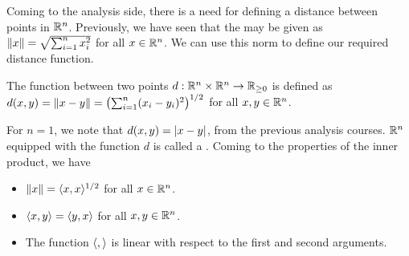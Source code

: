 Coming to the analysis side, there is a need for defining a distance between points in $\mathbb{R}^{n}$. Previously, we have seen that the  may be given as $\left\lVert x\right\rVert = \sqrt{\sum_{i=1}^{n} x_{i}^{2}}$ for all $x \in \mathbb{R}^{n}$. We can use this norm to define our required distance function.

\begin{definition}
    The  function between two points $d:\mathbb{R}^{n} \times \mathbb{R}^{n} \to \mathbb{R}_{\geq 0}$ is defined as $d(x,y) = \left\lVert x-y\right\rVert = \left( \sum_{i=1}^{n} (x_{i}-y_{i})^{2} \right)^{1/2}$ for all $x,y \in \mathbb{R}^{n}$.
\end{definition}
For $n = 1$, we note that $d(x,y) = \left| x-y \right|$, from the previous analysis courses. $\mathbb{R}^{n}$ equipped with the function $d$ is called a . Coming to the properties of the inner product, we have
\begin{itemize}
    \item $\left\lVert x\right\rVert = \langle x,x\rangle^{1/2}$ for all $x \in \mathbb{R}^{n}$.
    \item $\langle x,y\rangle = \langle y,x\rangle$ for all $x,y \in \mathbb{R}^{n}$.
    \item The function $\langle,\rangle$ is linear with respect to the first and second arguments.
\end{itemize}

